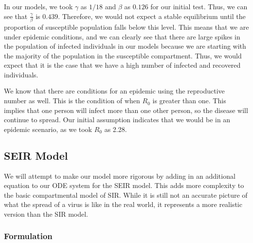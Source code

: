 \documentclass[12pt, a4paper]{article}
\begin{document}
        In our models, we took $\gamma$ as $1/18$ and $\beta$ as $0.126$ for our initial test. Thus, we can see that $\frac{\gamma}{\beta}$ is $0.439$. Therefore, we would not expect a stable equilibrium until the proportion of susceptible population falls below this level. This means that we are under epidemic conditions, and we can clearly see that there are large spikes in the population of infected individuals in our models because we are starting with the majority of the population in the susceptible compartment. Thus, we would expect that it is the case that we have a high number of infected and recovered individuals.
        
        We know that there are conditions for an epidemic using the reproductive number as well. This is the condition of when $R_0$ is greater than one. This implies that one person will infect more than one other person, so the disease will continue to spread. Our initial assumption indicates that we would be in an epidemic scenario, as we took $R_0$ as 2.28.
    
    \subsection{SEIR Model}
    
    We will attempt to make our model more rigorous by adding in an additional equation to our ODE system for the SEIR model. This adds more complexity to the basic compartmental model of SIR. While it is still not an accurate picture of what the spread of a virus is like in the real world, it represents a more realistic version than the SIR model.
    
    \subsubsection{Formulation}
    
\end{document}
